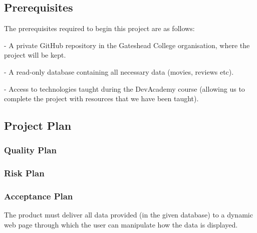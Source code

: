 \documentclass[a4paper,12pt]{article}
\begin{document}
\subsection{Prerequisites}

The prerequisites required to begin this project are as follows:

- A private GitHub repository in the Gateshead College organisation, where the project will be kept.

- A read-only database containing all necessary data (movies, reviews etc).

- Access to technologies taught during the DevAcademy course (allowing us to complete the project with resources that we have been taught).

\subsection{Project Plan}

\subsubsection{Quality Plan}

\subsubsection{Risk Plan}

\subsubsection{Acceptance Plan}

The product must deliver all data provided (in the given database) to a dynamic web page through which the user can manipulate how the data is displayed.
\end{document}
